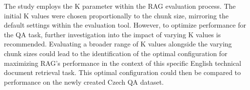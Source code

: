 The study employs the K parameter within the \ac{RAG} evaluation process.
The initial K values were chosen proportionally to the chunk size, mirroring the default settings within the evaluation tool.
However, to optimize performance for the \ac{QA} task, further investigation into the impact of varying K values is recommended.
Evaluating a broader range of K values alongside the varying chunk sizes could lead to the identification of the optimal configuration for maximizing \ac{RAG}'s performance in the context of this specific English technical document retrieval task.
This optimal configuration could then be compared to performance on the newly created Czech \ac{QA} dataset.




